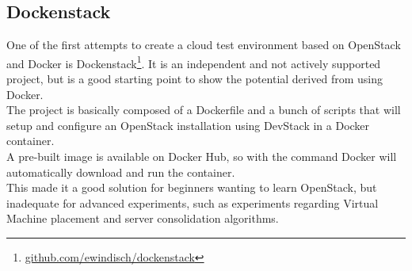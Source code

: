 
\subsection{Dockenstack}
\label{sub:sota_dockenstack}
One of the first attempts to create a cloud test environment based on OpenStack and Docker is Dockenstack\footnote{\url{github.com/ewindisch/dockenstack}}. It is an independent and not actively supported project, but is a good starting point to show the potential derived from using Docker.\\
The project is basically composed of a Dockerfile and a bunch of scripts that will setup and configure an OpenStack installation using DevStack in a Docker container.\\
A pre-built image is available on Docker Hub, so with the command  Docker will automatically download and run the container.\\
This made it a good solution for beginners wanting to learn OpenStack, but inadequate for advanced experiments, such as experiments regarding Virtual Machine placement and server consolidation algorithms.

